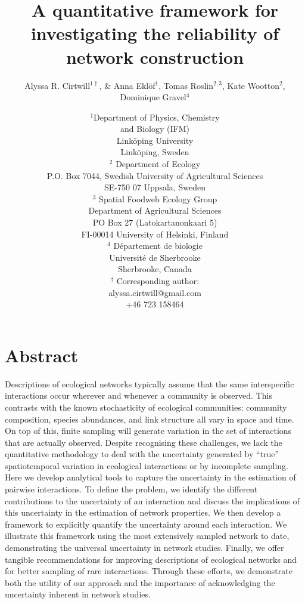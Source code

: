 \documentclass[12pt]{article}
\title{A quantitative framework for investigating the reliability of network construction}
\author{Alyssa R. Cirtwill$^{1\dagger}$, \&  Anna Ekl\"{o}f$^{1}$, Tomas Roslin$^{2,3}$, Kate Wootton$^{2}$, Dominique Gravel$^{4}$}
\date{\small$^1$Department of Physics, Chemistry\\ 
and Biology (IFM)\\ 
Link\"{o}ping University\\
Link\"{o}ping, Sweden\\
\medskip $^2$ Department of Ecology\\ P.O. Box 7044, Swedish University of Agricultural Sciences \\ SE-750 07 Uppsala, Sweden \\
\medskip $^3$ Spatial Foodweb Ecology Group\\ Department of Agricultural Sciences \\ PO Box 27 (Latokartanonkaari 5)\\ FI-00014 University of Helsinki, Finland \\
\medskip$^4$ D\'{e}partement de biologie\\ 
Universit\'{e} de Sherbrooke\\ 
Sherbrooke, Canada\\ 
\medskip
$^\dagger$ Corresponding author:\\
alyssa.cirtwill@gmail.com\\
+46 723 158464\\
}
\begin{document}
 
\maketitle 
\raggedright
\setlength{\parindent}{15pt} 


\section*{Abstract}

  Descriptions of ecological networks typically assume that the same interspecific interactions occur wherever and whenever a community is observed. This contrasts with the known stochasticity of ecological communities: community composition, species abundances, and link structure all vary in space and time. On top of this, finite sampling will generate variation in the set of interactions that are actually observed. Despite recognising these challenges, we lack the quantitative methodology to deal with the uncertainty generated by “true” spatiotemporal variation in ecological interactions or by incomplete sampling. Here we develop analytical tools to capture the uncertainty in the estimation of pairwise interactions. To define the problem, we identify the different contributions to the uncertainty of an interaction and discuss the implications of this uncertainty in the estimation of network properties. We then develop a framework to explicitly quantify the uncertainty around each interaction. We illustrate this framework using the most extensively sampled network to date, demonstrating the universal uncertainty in network studies. Finally, we offer tangible recommendations for improving descriptions of ecological networks and for better sampling of rare interactions. Through these efforts, we demonstrate both the utility of our approach and the importance of acknowledging the uncertainty inherent in network studies.


\end{document}
